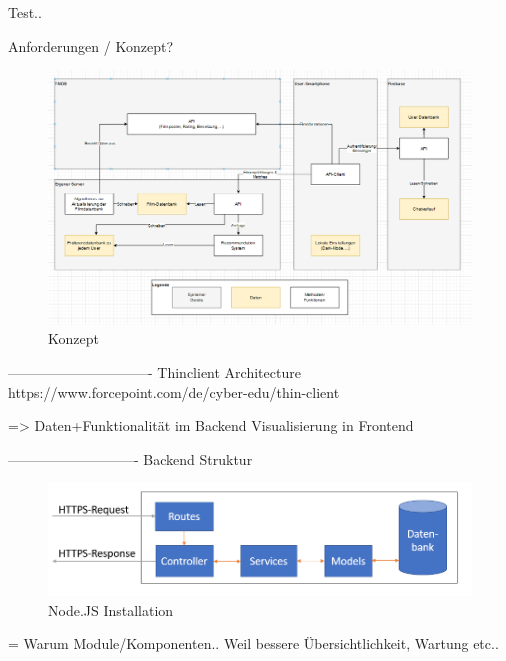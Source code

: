 Test..

Anforderungen / Konzept?

\begin{figure}[h]
\centering
\includegraphics[width=14cm]{images/Konzept.PNG}
\caption{Konzept}
\end{figure}

-------------------------------
\newline
Thinclient Architecture
https://www.forcepoint.com/de/cyber-edu/thin-client

=> Daten+Funktionalität im Backend
   Visualisierung in Frontend
   
   
  
----------------------------
\newline
Backend Struktur

\begin{figure}[h]
\centering
\includegraphics[width=\textwidth]{images/backendstruktur.PNG}
\caption{Node.JS Installation}
\end{figure}

= Warum Module/Komponenten.. Weil bessere Übersichtlichkeit, Wartung etc..